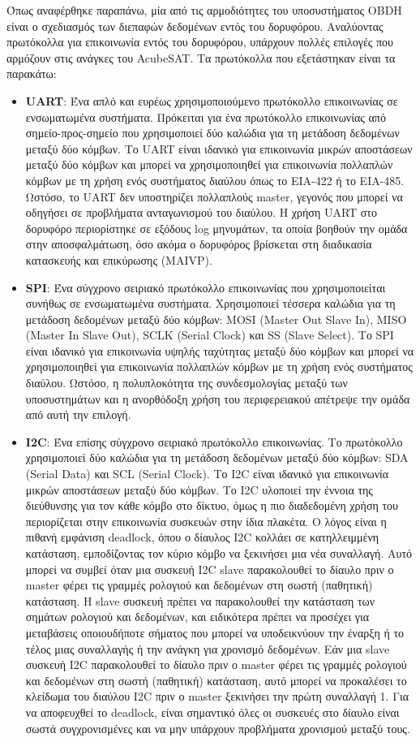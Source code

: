 \documentclass[a4paper,nobib,justified]{tufte-book}
\begin{document}
Όπως αναφέρθηκε παραπάνω, μία από τις αρμοδιότητες του υποσυστήματος OBDH είναι ο σχεδιασμός των διεπαφών δεδομένων εντός του δορυφόρου. 
Αναλύοντας πρωτόκολλα για επικοινωνία εντός του δορυφόρου, υπάρχουν πολλές επιλογές που αρμόζουν στις ανάγκες του AcubeSAT. Τα πρωτόκολλα που εξετάστηκαν είναι τα παρακάτω:
\begin{itemize}
	\item \textbf{UART}: Ένα απλό και ευρέως χρησιμοποιούμενο πρωτόκολλο επικοινωνίας σε ενσωματωμένα συστήματα. Πρόκειται για ένα πρωτόκολλο επικοινωνίας από σημείο-προς-σημείο που χρησιμοποιεί δύο καλώδια για τη μετάδοση δεδομένων μεταξύ δύο κόμβων. Το UART είναι ιδανικό για επικοινωνία μικρών αποστάσεων μεταξύ δύο κόμβων και μπορεί να χρησιμοποιηθεί για επικοινωνία πολλαπλών κόμβων με τη χρήση ενός συστήματος διαύλου όπως το EIA-422 ή το EIA-485. Ωστόσο, το UART δεν υποστηρίζει πολλαπλούς master, γεγονός που μπορεί να οδηγήσει σε προβλήματα ανταγωνισμού του διαύλου. Η χρήση UART στο δορυφόρο περιορίστηκε σε εξόδους log μηνυμάτων, τα οποία βοηθούν την ομάδα στην αποσφαλμάτωση, όσο ακόμα ο δορυφόρος βρίσκεται στη διαδικασία κατασκευής και επικύρωσης (MAIVP). 
	\item \textbf{SPI}: Ένα σύγχρονο σειριακό πρωτόκολλο επικοινωνίας που χρησιμοποιείται συνήθως σε ενσωματωμένα συστήματα. Χρησιμοποιεί τέσσερα καλώδια για τη μετάδοση δεδομένων μεταξύ δύο κόμβων: MOSI (Master Out Slave In), MISO (Master In Slave Out), SCLK (Serial Clock) και SS (Slave Select). Το SPI είναι ιδανικό για επικοινωνία υψηλής ταχύτητας μεταξύ δύο κόμβων και μπορεί να χρησιμοποιηθεί για επικοινωνία πολλαπλών κόμβων με τη χρήση ενός συστήματος διαύλου. Ωστόσο, η πολυπλοκότητα της συνδεσμολογίας μεταξύ των υποσυστημάτων και η ανορθόδοξη χρήση του περιφερειακού απέτρεψε την ομάδα από αυτή την επιλογή.
	\item \textbf{I2C}: Ένα επίσης σύγχρονο σειριακό πρωτόκολλο επικοινωνίας. Το πρωτόκολλο χρησιμοποιεί δύο καλώδια για τη μετάδοση δεδομένων μεταξύ δύο κόμβων: SDA (Serial Data) και SCL (Serial Clock). Το I2C είναι ιδανικό για επικοινωνία μικρών αποστάσεων μεταξύ δύο κόμβων. Το I2C υλοποιεί την έννοια της διεύθυνσης για τον κάθε κόμβο στο δίκτυο, όμως η πιο διαδεδομένη χρήση του περιορίζεται στην επικοινωνία συσκευών στην ίδια πλακέτα. Ο λόγος είναι η πιθανή εμφάνιση deadlock, όπου ο δίαυλος I2C κολλάει σε κατηλλειμμένη κατάσταση, εμποδίζοντας τον κύριο κόμβο να ξεκινήσει μια νέα συναλλαγή. Αυτό μπορεί να συμβεί όταν μια συσκευή I2C slave παρακολουθεί το δίαυλο πριν ο master φέρει τις γραμμές ρολογιού και δεδομένων στη σωστή (παθητική) κατάσταση. Η slave συσκευή πρέπει να παρακολουθεί την κατάσταση των σημάτων ρολογιού και δεδομένων, και ειδικότερα πρέπει να προσέχει για μεταβάσεις οποιουδήποτε σήματος που μπορεί να υποδεικνύουν την έναρξη ή το τέλος μιας συναλλαγής ή την ανάγκη για χρονισμό δεδομένων. Εάν μια slave συσκευή I2C παρακολουθεί το δίαυλο πριν ο master φέρει τις γραμμές ρολογιού και δεδομένων στη σωστή (παθητική) κατάσταση, αυτό μπορεί να προκαλέσει το κλείδωμα του διαύλου I2C πριν ο master ξεκινήσει την πρώτη συναλλαγή 1. Για να αποφευχθεί το deadlock, είναι σημαντικό όλες οι συσκευές στο δίαυλο είναι σωστά συγχρονισμένες και να μην υπάρχουν προβλήματα χρονισμού μεταξύ τους.

\end{itemize}
\end{document}
